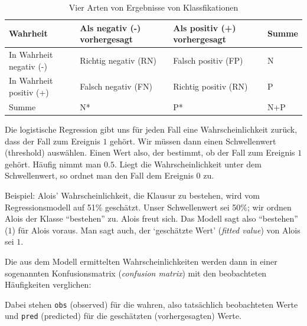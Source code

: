 \documentclass[12pt,ngerman,]{book}
\makeatletter
\newenvironment{Shaded}{\begin{snugshade}}{\end{snugshade}}
\newcommand{\KeywordTok}[1]{\textcolor[rgb]{0.13,0.29,0.53}{\textbf{#1}}}
\newcommand{\StringTok}[1]{\textcolor[rgb]{0.31,0.60,0.02}{#1}}
\newcommand{\CommentTok}[1]{\textcolor[rgb]{0.56,0.35,0.01}{\textit{#1}}}
\newcommand{\OperatorTok}[1]{\textcolor[rgb]{0.81,0.36,0.00}{\textbf{#1}}}
\newcommand{\NormalTok}[1]{#1}
\newenvironment{kframe}{%
\medskip{}
\setlength{\fboxsep}{.8em}
 \def\at@end@of@kframe{}%
 \ifinner\ifhmode%
  \def\at@end@of@kframe{\end{minipage}}%
  \begin{minipage}{\columnwidth}%
 \fi\fi%
 \def\FrameCommand##1{\hskip\@totalleftmargin \hskip-\fboxsep
 \colorbox{shadecolor}{##1}\hskip-\fboxsep
     \hskip-\linewidth \hskip-\@totalleftmargin \hskip\columnwidth}%
 \MakeFramed {\advance\hsize-\width
   \@totalleftmargin\z@ \linewidth\hsize
   \@setminipage}}%
 {\par\unskip\endMakeFramed%
 \at@end@of@kframe}
\renewenvironment{Shaded}{\begin{kframe}}{\end{kframe}}
\theoremstyle{definition}
\theoremstyle{definition}
\theoremstyle{remark}
\makeatother
\begin{document}
\begin{table}

\caption{\label{tab:class-stats}Vier Arten von Ergebnisse von Klassfikationen}
\centering
\begin{tabular}[t]{l|l|l|l}
\hline
Wahrheit & Als negativ (-) vorhergesagt & Als positiv (+) vorhergesagt & Summe\\
\hline
In Wahrheit negativ (-) & Richtig negativ (RN) & Falsch positiv (FP) & N\\
\hline
In Wahrheit positiv (+) & Falsch negativ (FN) & Richtig positiv (RN) & P\\
\hline
Summe & N* & P* & N+P\\
\hline
\end{tabular}
\end{table}

Die logistische Regression gibt uns für jeden Fall eine
Wahrscheinlichkeit zurück, dass der Fall zum Ereignis \(1\) gehört. Wir
müssen dann einen Schwellenwert (threshold) auswählen. Einen Wert also,
der bestimmt, ob der Fall zum Ereignis \(1\) gehört. Häufig nimmt man
\(0.5\). Liegt die Wahrscheinlichkeit unter dem Schwellenwert, so ordnet
man den Fall dem Ereignis \(0\) zu.

Beispiel: Alois' Wahrscheinlichkeit, die Klausur zu bestehen, wird vom
Regressionsmodell auf 51\% geschätzt. Unser Schwellenwert sei 50\%; wir
ordnen Alois der Klasse ``bestehen'' zu. Alois freut sich. Das Modell
sagt also ``bestehen'' (\(1\)) für Alois voraus. Man sagt auch, der
`geschätzte Wert' (\emph{fitted value}) von Alois sei \(1\).

Die aus dem Modell ermittelten Wahrscheinlichkeiten werden dann in einer
sogenannten Konfusionsmatrix (\emph{confusion
matrix}) mit den beobachteten Häufigkeiten verglichen:

\begin{Shaded}
\end{Shaded}

Dabei stehen \texttt{obs} (observed) für die wahren, also tatsächlich
beobachteten Werte und \texttt{pred} (predicted) für die geschätzten
(vorhergesagten) Werte.
\end{document}
